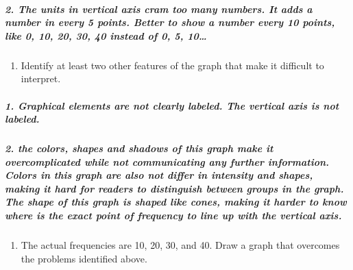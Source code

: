 \documentclass[]{article}
\newenvironment{Shaded}{\begin{snugshade}}{\end{snugshade}}
\newcommand{\KeywordTok}[1]{\textcolor[rgb]{0.13,0.29,0.53}{\textbf{#1}}}
\newcommand{\DataTypeTok}[1]{\textcolor[rgb]{0.13,0.29,0.53}{#1}}
\newcommand{\DecValTok}[1]{\textcolor[rgb]{0.00,0.00,0.81}{#1}}
\newcommand{\StringTok}[1]{\textcolor[rgb]{0.31,0.60,0.02}{#1}}
\newcommand{\OperatorTok}[1]{\textcolor[rgb]{0.81,0.36,0.00}{\textbf{#1}}}
\newcommand{\NormalTok}[1]{#1}
\providecommand{\tightlist}{%
  \setlength{\itemsep}{0pt}\setlength{\parskip}{0pt}}
\let\oldsubparagraph\subparagraph
\renewcommand{\subparagraph}[1]{\oldsubparagraph{#1}\mbox{}}
\begin{document}
\subparagraph{2. The units in vertical axis cram too many numbers. It
adds a number in every 5 points. Better to show a number every 10
points, like 0, 10, 20, 30, 40 instead of 0, 5,
10\ldots{}}\label{the-units-in-vertical-axis-cram-too-many-numbers.-it-adds-a-number-in-every-5-points.-better-to-show-a-number-every-10-points-like-0-10-20-30-40-instead-of-0-5-10}

\begin{enumerate}
\def\labelenumi{\alph{enumi}.}
\setcounter{enumi}{1}
\tightlist
\item
  Identify at least two other features of the graph that make it
  difficult to interpret.
\end{enumerate}

\subparagraph{1. Graphical elements are not clearly labeled. The
vertical axis is not
labeled.}\label{graphical-elements-are-not-clearly-labeled.-the-vertical-axis-is-not-labeled.}

\subparagraph{2. the colors, shapes and shadows of this graph make it
overcomplicated while not communicating any further information. Colors
in this graph are also not differ in intensity and shapes, making it
hard for readers to distinguish between groups in the graph. The shape
of this graph is shaped like cones, making it harder to know where is
the exact point of frequency to line up with the vertical
axis.}\label{the-colors-shapes-and-shadows-of-this-graph-make-it-overcomplicated-while-not-communicating-any-further-information.-colors-in-this-graph-are-also-not-differ-in-intensity-and-shapes-making-it-hard-for-readers-to-distinguish-between-groups-in-the-graph.-the-shape-of-this-graph-is-shaped-like-cones-making-it-harder-to-know-where-is-the-exact-point-of-frequency-to-line-up-with-the-vertical-axis.}

\begin{enumerate}
\def\labelenumi{\alph{enumi}.}
\setcounter{enumi}{2}
\tightlist
\item
  The actual frequencies are 10, 20, 30, and 40. Draw a graph that
  overcomes the problems identified above.
\end{enumerate}

\begin{Shaded}
\end{Shaded}
\end{document}
